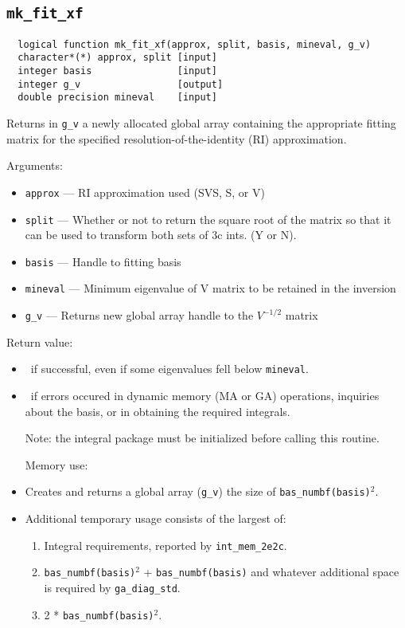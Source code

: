 \subsection{{\tt mk\_fit\_xf}}
\begin{verbatim}
  logical function mk_fit_xf(approx, split, basis, mineval, g_v)
  character*(*) approx, split [input]
  integer basis               [input]
  integer g_v                 [output]
  double precision mineval    [input]
\end{verbatim}
Returns in \verb+g_v+ a newly allocated global array containing the
appropriate fitting matrix for the specified
resolution-of-the-identity (RI) approximation.

 Arguments:
\begin{itemize}
\item \verb+approx+ --- RI approximation used (SVS, S, or V)
\item \verb+split+ ---  Whether or not to return the square root of the matrix
              so that it can be used to transform both sets of 3c ints.
              (Y or N).
\item \verb+basis+ --- Handle to fitting basis
\item \verb+mineval+ --- Minimum eigenvalue of V matrix to be retained in 
              the inversion
\item \verb+g_v+ ---  Returns new global array handle to the $V^{-1/2}$ matrix
\end{itemize}

Return value:
\begin{itemize}
\item \TRUE\ if successful, even if some eigenvalues fell below \verb+mineval+.
\item \FALSE\ if errors occured in dynamic memory (MA or GA) operations,
inquiries about the basis, or in obtaining the required integrals.

Note: the integral package must be initialized before calling this routine.

Memory use:
\item Creates and returns a global array (\verb+g_v+) the size of 
\verb+bas_numbf(basis)+$^2$.
\item Additional temporary usage consists of the largest of:
\begin{enumerate}
\item Integral requirements, reported by \verb+int_mem_2e2c+.
\item \verb+bas_numbf(basis)+$^2$ + \verb+bas_numbf(basis)+ and whatever additional
        space is required by \verb+ga_diag_std+.
\item 2 * \verb+bas_numbf(basis)+$^2$.
\end{enumerate}
\end{itemize}

